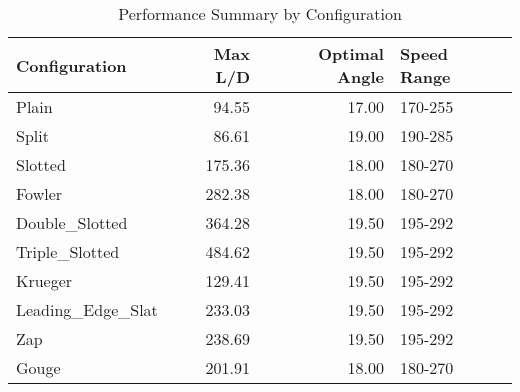 \begin{table}
\caption{Performance Summary by Configuration}
\label{tab:perf_summary}
\begin{tabular}{lrrl}
\toprule
Configuration & Max L/D & Optimal Angle & Speed Range \\
\midrule
Plain & 94.55 & 17.00 & 170-255 \\
Split & 86.61 & 19.00 & 190-285 \\
Slotted & 175.36 & 18.00 & 180-270 \\
Fowler & 282.38 & 18.00 & 180-270 \\
Double_Slotted & 364.28 & 19.50 & 195-292 \\
Triple_Slotted & 484.62 & 19.50 & 195-292 \\
Krueger & 129.41 & 19.50 & 195-292 \\
Leading_Edge_Slat & 233.03 & 19.50 & 195-292 \\
Zap & 238.69 & 19.50 & 195-292 \\
Gouge & 201.91 & 18.00 & 180-270 \\
\bottomrule
\end{tabular}
\end{table}
